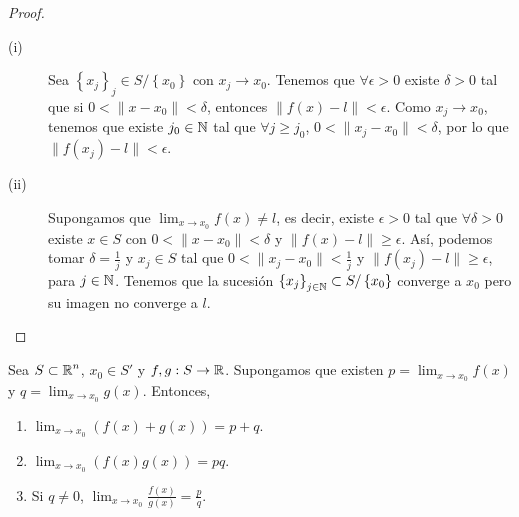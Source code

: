 \begin{proof}
\begin{description}
	\item[(i)] Sea $\displaystyle \left\{ x_{j}\right\} _{j} \in S / \left\{ x_{0}\right\}  $ con $\displaystyle x_{j} \to x_{0} $. Tenemos que $\displaystyle \forall \epsilon > 0 $ existe $\displaystyle \delta > 0 $ tal que si $\displaystyle  0 < \| x - x_{0}\| < \delta  $, entonces $\displaystyle \|f\left(x\right)-l\| < \epsilon  $. Como $\displaystyle x_{j} \to x_{0} $, tenemos que existe $\displaystyle j _{0} \in \mathbb{N} $ tal que $\displaystyle \forall j \geq j_{0} $, $\displaystyle 0 < \|x_{j}-x_{0}\| < \delta  $, por lo que $\displaystyle \| f\left(x_{j}\right)-l \| < \epsilon  $. 
	\item[(ii)] Supongamos que $\displaystyle \lim_{x \to x_{0}}f\left(x\right) \neq l $, es decir, existe $\displaystyle \epsilon > 0 $ tal que $\displaystyle \forall \delta > 0 $ existe $\displaystyle x \in S $ con $\displaystyle 0 < \|x - x_{0}\|< \delta  $ y $\displaystyle \|f\left(x\right)-l\| \geq \epsilon  $. 
		Así, podemos tomar $\displaystyle \delta = \frac{1}{j} $ y $\displaystyle x_{j} \in S $ tal que $\displaystyle 0< \|x_{j}-x_{0}\| < \frac{1}{j} $ y $\displaystyle \|f\left(x_{j}\right)-l\| \geq \epsilon  $, para $\displaystyle j \in \mathbb{N} $. Tenemos que la sucesión $\displaystyle \left\{ x_{j}\right\} _{j\in \mathbb{N}} \subset S/ \left\{ x_{0}\right\}  $ converge a $\displaystyle x_{0} $ pero su imagen no converge a $\displaystyle l $.
\end{description}
\end{proof}
\begin{prop}
Sea $\displaystyle S \subset \mathbb{R}^{n} $, $\displaystyle x_{0} \in S' $ y $\displaystyle f, g : S \to \mathbb{R} $. Supongamos que existen $\displaystyle p = \lim_{x \to x_{0}}f\left(x\right) $ y $\displaystyle q =\lim_{x \to x_{0}}g\left(x\right) $. 
Entonces, 
\begin{enumerate}
\item $\displaystyle \lim_{x \to x_{0}}\left(f\left(x\right) + g\left(x\right)\right) = p + q $.
\item $\displaystyle \lim_{x \to x_{0}}\left(f\left(x\right)g\left(x\right)\right) = pq $.
\item Si $\displaystyle q \neq 0 $, $\displaystyle \lim_{x \to x_{0}}\frac{f\left(x\right)}{g\left(x\right)} = \frac{p}{q} $.
\end{enumerate}
\end{prop}

